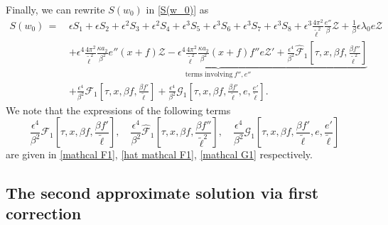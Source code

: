 \documentclass[10pt, reqno]{amsart}
\numberwithin{equation}{section}
\theoremstyle{definition}
\begin{document}
{{Finally, we can rewrite $S(w_0)$ in \eqref{S(w_0)} as
\begin{align}
 S(w_0) \,= \,&
 \epsilon S_1 + \epsilon S_2 + \epsilon^2 S_3 + \epsilon^2 S_4 + \epsilon^3 S_5
 + \epsilon^3 S_6 + \epsilon^3 S_7+\epsilon^3 S_8 +\epsilon^3\frac{4\pi^2}{{\tilde\ell}^2} \frac{e''}{\beta}\mathcal Z
 +\frac1{\beta} \epsilon\lambda_0 e{\mathcal Z}
\nonumber\\[2mm]
 &
 \underbrace{ +\epsilon^4 \frac{4\pi^2} {{\tilde\ell}^2} \frac{\kappa a_2}{\, \beta^2\, } e'' (x+f)\mathcal Z
  -\epsilon^4  \frac{ 4\pi^2} {{\tilde\ell}^2}  \frac{\kappa a_2}{\, \beta^2\, } (x+f) f'' e \mathcal Z' + \frac{\epsilon^4}{\beta^2} \hat{\mathcal F}_1\left[\tau, x, \beta f, \frac{\beta f''}{\tilde\ell^2} \right] }_{\text{terms involving}~f'', e''}
\nonumber\\[2mm]
 &
 + \frac{\epsilon^4}{\beta^2} \mathcal F_1\left[\tau, x, \beta f, \frac{\beta f'}{\tilde\ell}\right]
 +\frac{\epsilon^4} {\beta^2} \mathcal G_1\left[\tau, x, \beta f, \frac{\beta f'}{\tilde\ell}, e, \frac{e'}{\tilde\ell}\right].
\label{error1}
\end{align}
We note that the expressions of the following terms
$$
\frac{\epsilon^4}{\beta^2} \mathcal F_1\left[\tau, x, \beta f, \frac{\beta f'}{\tilde\ell}\right],
\quad
\frac{\epsilon^4}{\beta^2} \hat{\mathcal F}_1\left[\tau, x, \beta f, \frac{\beta f''}{\tilde\ell^2} \right],
\quad
\frac{\epsilon^4} {\beta^2} \mathcal G_1\left[\tau, x, \beta f, \frac{\beta f'}{\tilde\ell}, e, \frac{e'}{\tilde\ell}\right]
$$
are given in \eqref{mathcal F1}, \eqref{hat mathcal F1}, \eqref{mathcal G1} respectively.





\medskip
\subsection{ The second approximate solution via first correction}\label{Section5.2}\


}}
\end{document}
